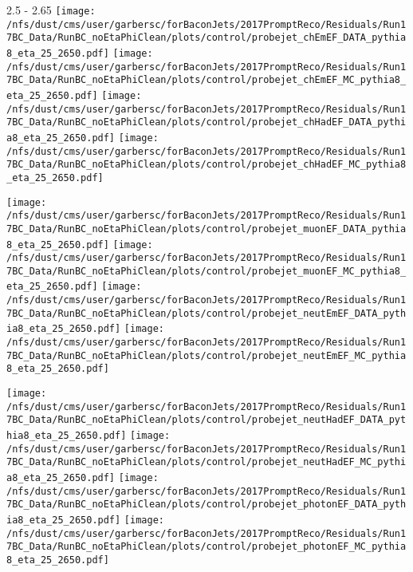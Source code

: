 \documentclass[t,compress]{beamer}
\begin{document}
\begin{frame}{2.5 - 2.65}
	\texttt{[image: /nfs/dust/cms/user/garbersc/forBaconJets/2017PromptReco/Residuals/Run17BC\_Data/RunBC\_noEtaPhiClean/plots/control/probejet\_chEmEF\_DATA\_pythia8\_eta\_25\_2650.pdf]}
	\texttt{[image: /nfs/dust/cms/user/garbersc/forBaconJets/2017PromptReco/Residuals/Run17BC\_Data/RunBC\_noEtaPhiClean/plots/control/probejet\_chEmEF\_MC\_pythia8\_eta\_25\_2650.pdf]}
	\texttt{[image: /nfs/dust/cms/user/garbersc/forBaconJets/2017PromptReco/Residuals/Run17BC\_Data/RunBC\_noEtaPhiClean/plots/control/probejet\_chHadEF\_DATA\_pythia8\_eta\_25\_2650.pdf]}
	\texttt{[image: /nfs/dust/cms/user/garbersc/forBaconJets/2017PromptReco/Residuals/Run17BC\_Data/RunBC\_noEtaPhiClean/plots/control/probejet\_chHadEF\_MC\_pythia8\_eta\_25\_2650.pdf]}
\newline

\vspace{-0.65cm}
	\texttt{[image: /nfs/dust/cms/user/garbersc/forBaconJets/2017PromptReco/Residuals/Run17BC\_Data/RunBC\_noEtaPhiClean/plots/control/probejet\_muonEF\_DATA\_pythia8\_eta\_25\_2650.pdf]}
	\texttt{[image: /nfs/dust/cms/user/garbersc/forBaconJets/2017PromptReco/Residuals/Run17BC\_Data/RunBC\_noEtaPhiClean/plots/control/probejet\_muonEF\_MC\_pythia8\_eta\_25\_2650.pdf]}
	\texttt{[image: /nfs/dust/cms/user/garbersc/forBaconJets/2017PromptReco/Residuals/Run17BC\_Data/RunBC\_noEtaPhiClean/plots/control/probejet\_neutEmEF\_DATA\_pythia8\_eta\_25\_2650.pdf]}
	\texttt{[image: /nfs/dust/cms/user/garbersc/forBaconJets/2017PromptReco/Residuals/Run17BC\_Data/RunBC\_noEtaPhiClean/plots/control/probejet\_neutEmEF\_MC\_pythia8\_eta\_25\_2650.pdf]}
\newline

\vspace{-0.65cm}
	\texttt{[image: /nfs/dust/cms/user/garbersc/forBaconJets/2017PromptReco/Residuals/Run17BC\_Data/RunBC\_noEtaPhiClean/plots/control/probejet\_neutHadEF\_DATA\_pythia8\_eta\_25\_2650.pdf]}
	\texttt{[image: /nfs/dust/cms/user/garbersc/forBaconJets/2017PromptReco/Residuals/Run17BC\_Data/RunBC\_noEtaPhiClean/plots/control/probejet\_neutHadEF\_MC\_pythia8\_eta\_25\_2650.pdf]}
	\texttt{[image: /nfs/dust/cms/user/garbersc/forBaconJets/2017PromptReco/Residuals/Run17BC\_Data/RunBC\_noEtaPhiClean/plots/control/probejet\_photonEF\_DATA\_pythia8\_eta\_25\_2650.pdf]}
	\texttt{[image: /nfs/dust/cms/user/garbersc/forBaconJets/2017PromptReco/Residuals/Run17BC\_Data/RunBC\_noEtaPhiClean/plots/control/probejet\_photonEF\_MC\_pythia8\_eta\_25\_2650.pdf]}
\end{frame}
\end{document}
